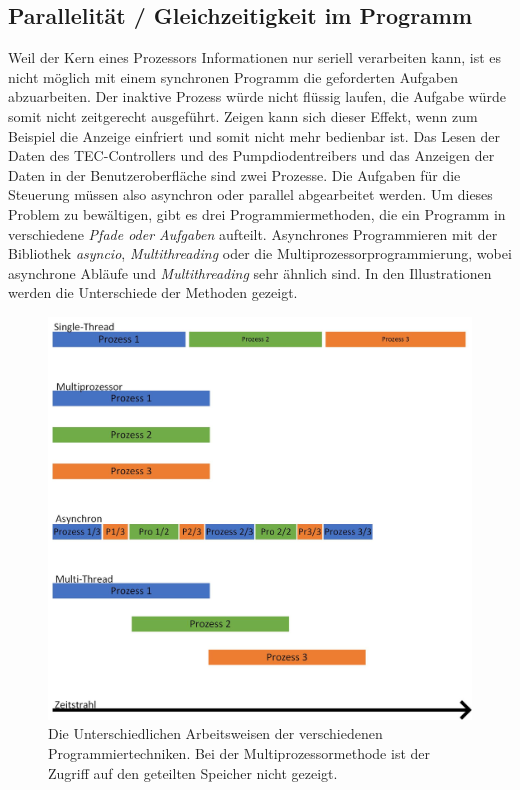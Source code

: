 \subsection{Parallelität / Gleichzeitigkeit im Programm}
\label{concurrency}
Weil der Kern eines Prozessors Informationen nur seriell verarbeiten kann, ist es nicht möglich mit einem synchronen Programm die geforderten Aufgaben abzuarbeiten. Der inaktive Prozess würde nicht flüssig laufen, die Aufgabe würde somit nicht zeitgerecht ausgeführt. Zeigen kann sich dieser Effekt, wenn zum Beispiel die Anzeige einfriert und somit nicht mehr bedienbar ist. Das Lesen der Daten des TEC-Controllers und des Pumpdiodentreibers und das Anzeigen der Daten in der Benutzeroberfläche sind zwei Prozesse. Die Aufgaben für die Steuerung müssen also asynchron oder parallel abgearbeitet werden. Um dieses Problem zu bewältigen, gibt es drei Programmiermethoden, die ein Programm in verschiedene \textit{Pfade oder Aufgaben} aufteilt. Asynchrones Programmieren mit der Bibliothek \textit{asyncio}, \textit{Multithreading} oder die Multiprozessorprogrammierung, wobei asynchrone Abläufe und \textit{Multithreading} sehr ähnlich sind. In den Illustrationen werden die Unterschiede der Methoden gezeigt.

\begin{figure}[H]
    \centering
    \includegraphics[scale=0.175]{98_images/concurrent_programming.jpg}  %
    \caption{Die Unterschiedlichen Arbeitsweisen der verschiedenen Programmiertechniken. Bei der Multiprozessormethode ist der Zugriff auf den geteilten Speicher nicht gezeigt.}
    \label{fig:multi_threading_async}
\end{figure}

